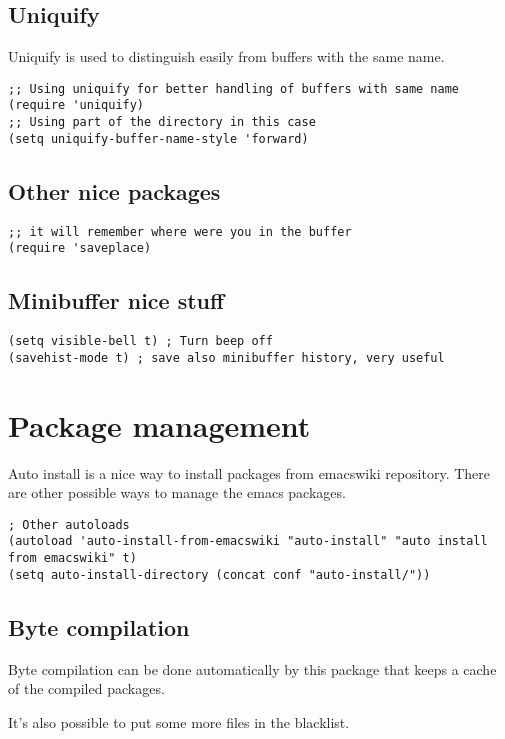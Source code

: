 \documentclass[11pt]{article}
\begin{document}
\subsection{Uniquify}
\label{sec-20.2}

   Uniquify is used to distinguish easily from buffers with the same name.
\begin{verbatim}
;; Using uniquify for better handling of buffers with same name
(require 'uniquify)
;; Using part of the directory in this case
(setq uniquify-buffer-name-style 'forward)
\end{verbatim}
\subsection{Other nice packages}
\label{sec-20.3}

\begin{verbatim}
;; it will remember where were you in the buffer
(require 'saveplace)
\end{verbatim}
\subsection{Minibuffer nice stuff}
\label{sec-20.4}

\begin{verbatim}
(setq visible-bell t) ; Turn beep off
(savehist-mode t) ; save also minibuffer history, very useful
\end{verbatim}
\section{Package management}
\label{sec-21}

  Auto install is a nice way to install packages from emacswiki repository.
  There are other possible ways to manage the emacs packages.
\begin{verbatim}
; Other autoloads
(autoload 'auto-install-from-emacswiki "auto-install" "auto install from emacswiki" t)
(setq auto-install-directory (concat conf "auto-install/"))
\end{verbatim}
\subsection{Byte compilation}
\label{sec-21.1}

   Byte compilation can be done automatically by this package that keeps a cache of the compiled packages.

   It's also possible to put some more files in the blacklist.
\end{document}
